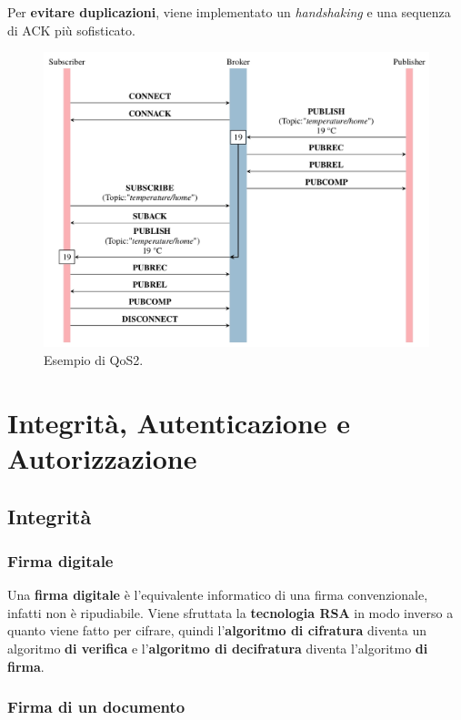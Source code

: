 \documentclass[a4paper]{article}
\begin{document}
	\noindent
	Per \textbf{evitare duplicazioni}, viene implementato un \emph{handshaking} e una sequenza di ACK più sofisticato.
	\begin{figure}[!htp]
		\centering
		\includegraphics[width=\textwidth]{img/pub-sub/QoS2.jpg}
		\caption{Esempio di QoS2.}
	\end{figure}\newpage
	
	\section{Integrità, Autenticazione e Autorizzazione}
	
	\subsection{Integrità}
	
	\subsubsection{Firma digitale}
	
	Una \textbf{firma digitale} è l'equivalente informatico di una firma convenzionale, infatti non è ripudiabile. Viene sfruttata la \textbf{tecnologia RSA} in modo inverso a quanto viene fatto per cifrare, quindi l'\textbf{algoritmo di cifratura} diventa un algoritmo \textbf{di verifica} e l'\textbf{algoritmo di  decifratura} diventa l'algoritmo \textbf{di firma}.\newpage
	
	\subsubsection{Firma di un documento}
	
\end{document}
